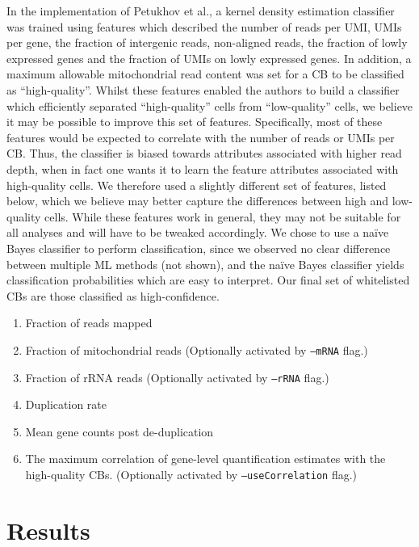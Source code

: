 In the implementation of Petukhov et al.\citep{dropest}, a kernel density estimation classifier was trained using features which described the number of reads per UMI, UMIs per gene, the fraction of intergenic reads, non-aligned reads, the fraction of lowly expressed genes and the fraction of UMIs on lowly expressed genes. In addition, a maximum allowable mitochondrial read content was set for a CB to be classified as ``high-quality''. Whilst these features enabled the authors to build a classifier which efficiently separated ``high-quality'' cells from ``low-quality'' cells, we believe it may be possible to improve this set of features. Specifically, most of these features would be expected to correlate with the number of reads or UMIs per CB. Thus, the classifier is biased towards attributes  associated with higher read depth, when in fact one wants it to learn the feature attributes associated with high-quality cells. We therefore used a slightly different set of features, listed below, which we believe may better capture the differences between high and low-quality cells. While these features work in general, they may not be suitable for all analyses and will have to be tweaked accordingly. We chose to use a na\"ive Bayes classifier to perform classification, since we observed no clear difference between multiple ML methods (not shown), and the na\"ive Bayes classifier yields classification probabilities which are easy to interpret. Our final set of whitelisted CBs are those classified as high-confidence.

\begin{enumerate}  
\item Fraction of reads mapped
\item Fraction of mitochondrial reads (Optionally activated by \texttt{--mRNA} flag.)
\item Fraction of rRNA reads (Optionally activated by \texttt{--rRNA} flag.)
\item Duplication rate
\item Mean gene counts post de-duplication
\item The maximum correlation of gene-level quantification estimates with the high-quality CBs. (Optionally activated by \texttt{--useCorrelation} flag.)
\end{enumerate}


\section{Results}

